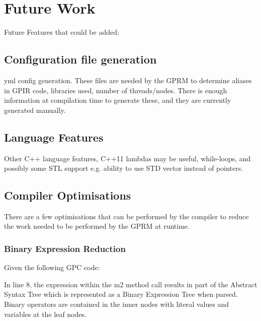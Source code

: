 \chapter{Future Work}

Future Features that could be added:

\section{Configuration file generation}
    yml config generation.
    These files are needed by the GPRM to determine aliases in GPIR code, libraries used,
    number of threads/nodes. There is enough information at compilation time to generate these,
    and they are currently generated manually. 


\section{Language Features}
    Other C++ language features, C++11 lambdas may be useful,
    while-loops, and possibly some STL support e.g. ability to use STD vector instead of pointers.

\section{Compiler Optimisations}

    There are a few optimisations that can be performed by the compiler to reduce the work needed to be 
    performed by the GPRM at runtime.

\subsection{Binary Expression Reduction}
Given the following GPC code:    



In line 8, the expression within the m2 method call results in part of the Abstract Syntax Tree
which is represented as a Binary Expression Tree when parsed. Binary operators are contained in
the inner nodes with literal values and variables at the leaf nodes. 

